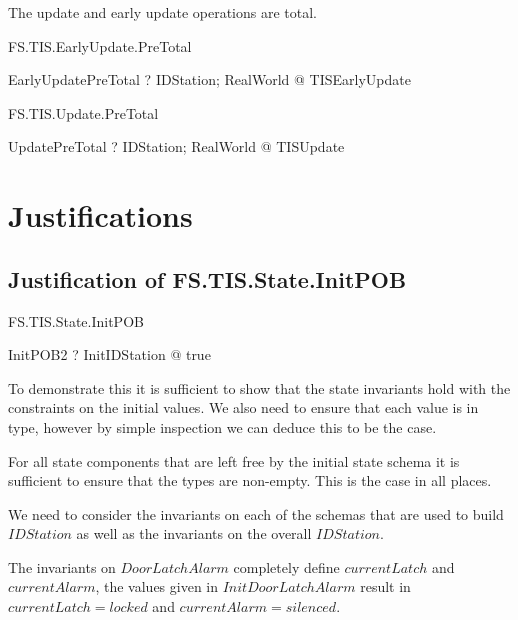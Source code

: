 The update and early update operations are total.

\begin{Zpobtrace}{FS.TIS.EarlyUpdate.PreTotal}
\begin{theorem}
EarlyUpdatePreTotal \vdash? \forall IDStation; RealWorld @ \pre TISEarlyUpdate
\end{theorem}
\end{Zpobtrace}

\begin{Zpobtrace}{FS.TIS.Update.PreTotal}
\begin{theorem}
 UpdatePreTotal \vdash? \forall IDStation; RealWorld @ \pre TISUpdate
\end{theorem}
\end{Zpobtrace}


\section{Justifications}

\subsection{Justification of FS.TIS.State.InitPOB}

\begin{Zpobtrace}{FS.TIS.State.InitPOB}
\begin{theorem}
InitPOB2 \vdash? \exists InitIDStation @ true
\end{theorem}
\end{Zpobtrace}

To demonstrate this it is sufficient to show that the state invariants
hold with the constraints on the initial values. We also need to
ensure that each value is in type, however by simple inspection we can
deduce this to be the case.

For all state components that are left free by the initial state
schema it is sufficient to ensure that the types are non-empty. This
is the case in all places.

We need to consider the invariants on each of the schemas that are
used to build $IDStation$ as well as the invariants on the overall
$IDStation$.

The invariants on $DoorLatchAlarm$ completely define $currentLatch$
and $currentAlarm$, the values given in $InitDoorLatchAlarm$ result in
$currentLatch = locked$ and $currentAlarm = silenced$.

